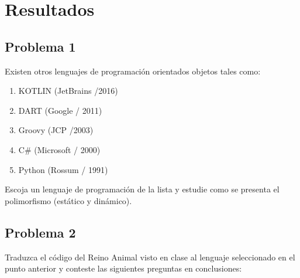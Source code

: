 \documentclass[11pt, twocolumn]{article}
\begin{document}
  \newpage
  \section*{Resultados}
  \subsection*{Problema 1}
  Existen otros lenguajes de programación orientados objetos tales como:

  \begin{enumerate}[label=\alph*.]
    \item KOTLIN (JetBrains /2016)
    \item DART (Google / 2011)
    \item Groovy (JCP /2003)
    \item C$\#$ (Microsoft / 2000)
    \item Python (Rossum / 1991)
  \end{enumerate}
  
  Escoja un lenguaje de programación de la lista y estudie como se presenta el polimorfismo (estático y dinámico).

  \subsection*{Problema 2}
  Traduzca el código del Reino Animal visto en clase al lenguaje seleccionado en el punto anterior y conteste las siguientes preguntas en conclusiones:
\end{document}
